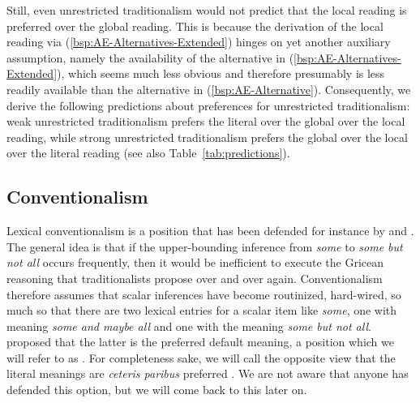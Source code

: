 \documentclass[fleqn,reqno,10pt,draft]{article}
\begin{document}
Still, even unrestricted traditionalism would not predict that the
local reading is preferred over the global reading. This is because
the derivation of the local reading via
(\ref{bsp:AE-Alternatives-Extended}) hinges on yet another auxiliary
assumption, namely the availability of the alternative in
(\ref{bsp:AE-Alternatives-Extended}), which seems much less obvious
and therefore presumably is less readily available than the
alternative in (\ref{bsp:AE-Alternative}). Consequently, we derive the
following predictions about preferences for unrestricted
traditionalism: weak unrestricted traditionalism prefers the literal
over the global over the local reading, while strong unrestricted
traditionalism prefers the global over the local over the literal
reading (see also Table~\ref{tab:predictions}).


\subsection{Conventionalism}
\label{sec:conventionalism}

Lexical conventionalism is a position that has been defended for
instance by \citet{LevinsonPresumptiveMeanings2000} and
\citet{Chierchia:2004_ScalarImplicatures}. The general idea is that
if the upper-bounding inference from \emph{some} to \emph{some but not
  all} occurs frequently, then it would be inefficient to execute the
Gricean reasoning that traditionalists propose over and over
again. Conventionalism therefore assumes that scalar inferences have
become routinized, hard-wired, so much so that there are two lexical
entries for a scalar item like \emph{some}, one with meaning
\emph{some and maybe all} and one with the meaning \emph{some but not
  all}. \citet{LevinsonPresumptiveMeanings2000} proposed that the
latter is the preferred default meaning, a position which we will
refer to as . For completeness sake, we will call the opposite view that
the literal meanings are \emph{ceteris paribus} preferred
. We are not aware that anyone has
defended this option, but we will come back to this later on.
\end{document}

